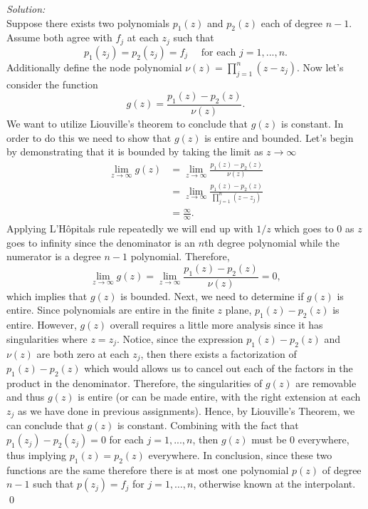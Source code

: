 \documentclass[10pt]{amsart}
\theoremstyle{nonumberplain}
\begin{document}
\begin{enumerate}[label={\bf {\arabic*}:}]
\begin{enumerate}
\noindent
\textit{Solution:} \\
Suppose there exists two polynomials $p_1(z)$ and $p_2(z)$ each of degree $n - 1$.
Assume both agree with $f_j$ at each $z_j$ such that
$$
p_1(z_j) = p_2(z_j) = f_j \quad \text{ for each } j = 1, ..., n.
$$
Additionally define the node polynomial $\nu (z) = \prod_{j=1}^n (z - z_j)$.
Now let's consider the function
$$
g(z) = \frac {p_1(z) - p_2(z)}{\nu(z)}.
$$
We want to utilize Liouville's theorem to conclude that $g(z)$ is constant.
In order to do this we need to show that $g(z)$ is entire and bounded.
Let's begin by demonstrating that it is bounded by taking the limit as $z\rightarrow\infty$
\begin{align*}
\lim_{z\rightarrow\infty}g(z) 
	&= \lim_{z\rightarrow\infty}\frac {p_1(z) - p_2(z)}{\nu(z)} \\
	&= \lim_{z\rightarrow\infty}\frac {p_1(z) - p_2(z)}{\prod_{j=1}^n (z - z_j)} \\
	&= \frac \infty \infty.
\end{align*}
Applying L'Hôpitals rule repeatedly we will end up with $1/z$ which goes to 0 as $z$ goes to infinity since the denominator is an $n$th degree polynomial while the numerator is a degree $n - 1$ polynomial.
Therefore,
$$
\lim_{z\rightarrow\infty}g(z) = \lim_{z\rightarrow\infty}\frac {p_1(z) - p_2(z)}{\nu(z)} = 0,
$$
which implies that $g(z)$ is bounded.
Next, we need to determine if $g(z)$ is entire.
Since polynomials are entire in the finite $z$ plane, $p_1(z) - p_2(z)$ is entire.
However, $g(z)$ overall requires a little more analysis since it has singularities where $z=z_j$.
Notice, since the expression $p_1(z) - p_2(z)$ and $\nu(z)$ are both zero at each $z_j$, then there exists a factorization of $p_1(z) - p_2(z)$ which would allows us to cancel out each of the factors in the product in the denominator.
Therefore, the singularities of $g(z)$ are removable and thus $g(z)$ is entire (or can be made entire, with the right extension at each $z_j$ as we have done in previous assignments).
Hence, by Liouville's Theorem, we can conclude that $g(z)$ is constant.
Combining with the fact that $p_1(z_j) - p_2(z_j) = 0$ for each $j = 1, ..., n$, then $g(z)$ must be 0 everywhere, thus implying $p_1(z) = p_2(z)$ everywhere.
In conclusion, since these two functions are the same therefore there is at most one polynomial $p(z)$ of degree $n - 1$ such that $p(z_j) = f_j$ for $j = 1,\ldots,n$, otherwise known at the interpolant. \\
\qed \\


\end{enumerate}
\end{enumerate}
\end{document}
